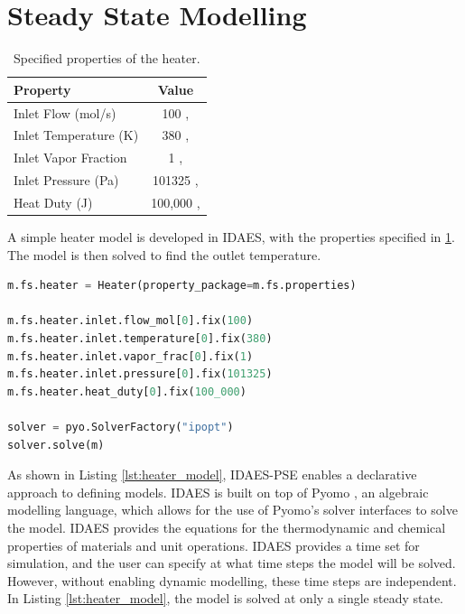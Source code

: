 \documentclass[12pt]{article}
\begin{document}
\section{Steady State Modelling} \label{sec:steady_state}

\begin{table}[h]
    \centering
    \begin{tabular}{|l|c|}
        \hline
        \textbf{Property} & \textbf{Value} \\
        \hline
        Inlet Flow (mol/s) & 100 , \\
        \hline
        Inlet Temperature (K) & 380 , \\
        \hline
        Inlet Vapor Fraction & 1 ,  \\
        \hline
        Inlet Pressure (Pa) & 101325 ,  \\
        \hline
        Heat Duty (J) & 100,000 , \\
        \hline
    \end{tabular}
    \caption{Specified properties of the heater.}
    \label{tab:heater_properties}
\end{table}

A simple heater model is developed in IDAES, with the properties specified in \cref{tab:heater_properties}. The model is then solved to find the outlet temperature.

\begin{lstlisting}[language=Python,caption=Defining a simple heater model in IDAES,label=lst:heater_model]
m.fs.heater = Heater(property_package=m.fs.properties)

m.fs.heater.inlet.flow_mol[0].fix(100)
m.fs.heater.inlet.temperature[0].fix(380)
m.fs.heater.inlet.vapor_frac[0].fix(1)
m.fs.heater.inlet.pressure[0].fix(101325)
m.fs.heater.heat_duty[0].fix(100_000)

solver = pyo.SolverFactory("ipopt")
solver.solve(m)

\end{lstlisting}

As shown in Listing \ref{lst:heater_model}, IDAES-PSE enables a declarative approach to defining models. IDAES is built on top of Pyomo \cite{bynum2021pyomo}, an algebraic modelling language, which allows for the use of Pyomo's solver interfaces to solve the model. IDAES provides the equations for the thermodynamic and chemical properties of materials and unit operations. IDAES provides a time set for simulation, and the user can specify at what time steps the model will be solved. However, without enabling dynamic modelling, these time steps are independent. In Listing \ref{lst:heater_model}, the model is solved at only a single steady state.
\end{document}
